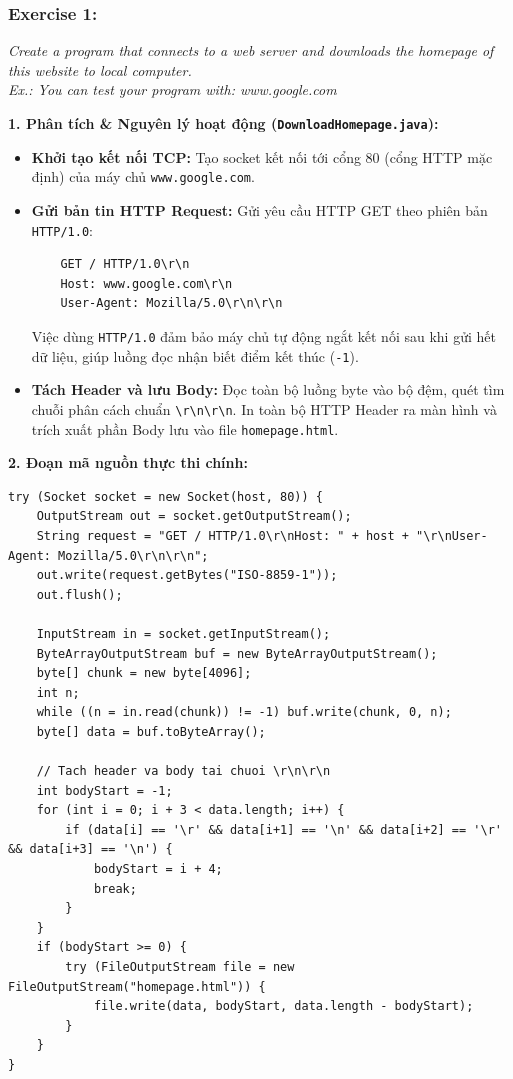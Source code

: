 \documentclass[11pt,a4paper]{article}
\begin{document}
\subsubsection*{Exercise 1:}
\noindent\textit{Create a program that connects to a web server and downloads the homepage of this website to local computer.\\
Ex.: You can test your program with: www.google.com}

\begin{solutionbox}[title=Báo cáo \& Bài làm: Exercise 1 -- Tải Trang chủ Web]
\textbf{1. Phân tích \& Nguyên lý hoạt động (\texttt{DownloadHomepage.java}):}
\begin{itemize}
    \item \textbf{Khởi tạo kết nối TCP:} Tạo socket kết nối tới cổng 80 (cổng HTTP mặc định) của máy chủ \texttt{www.google.com}.
    \item \textbf{Gửi bản tin HTTP Request:} Gửi yêu cầu HTTP GET theo phiên bản \texttt{HTTP/1.0}:
    \begin{verbatim}
    GET / HTTP/1.0\r\n
    Host: www.google.com\r\n
    User-Agent: Mozilla/5.0\r\n\r\n
    \end{verbatim}
    Việc dùng \texttt{HTTP/1.0} đảm bảo máy chủ tự động ngắt kết nối sau khi gửi hết dữ liệu, giúp luồng đọc nhận biết điểm kết thúc (\texttt{-1}).
    \item \textbf{Tách Header và lưu Body:} Đọc toàn bộ luồng byte vào bộ đệm, quét tìm chuỗi phân cách chuẩn \texttt{\textbackslash r\textbackslash n\textbackslash r\textbackslash n}. In toàn bộ HTTP Header ra màn hình và trích xuất phần Body lưu vào file \texttt{homepage.html}.
\end{itemize}

\textbf{2. Đoạn mã nguồn thực thi chính:}
\begin{lstlisting}
try (Socket socket = new Socket(host, 80)) {
    OutputStream out = socket.getOutputStream();
    String request = "GET / HTTP/1.0\r\nHost: " + host + "\r\nUser-Agent: Mozilla/5.0\r\n\r\n";
    out.write(request.getBytes("ISO-8859-1"));
    out.flush();

    InputStream in = socket.getInputStream();
    ByteArrayOutputStream buf = new ByteArrayOutputStream();
    byte[] chunk = new byte[4096];
    int n;
    while ((n = in.read(chunk)) != -1) buf.write(chunk, 0, n);
    byte[] data = buf.toByteArray();

    // Tach header va body tai chuoi \r\n\r\n
    int bodyStart = -1;
    for (int i = 0; i + 3 < data.length; i++) {
        if (data[i] == '\r' && data[i+1] == '\n' && data[i+2] == '\r' && data[i+3] == '\n') {
            bodyStart = i + 4;
            break;
        }
    }
    if (bodyStart >= 0) {
        try (FileOutputStream file = new FileOutputStream("homepage.html")) {
            file.write(data, bodyStart, data.length - bodyStart);
        }
    }
}
\end{lstlisting}


\end{solutionbox}
\end{document}
